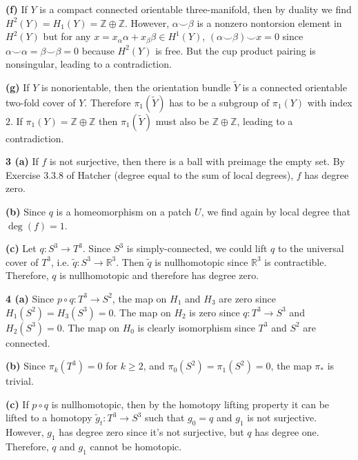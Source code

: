\documentclass{article}
\makeatletter
\newcommand*{\shifttext}[1]{%
  \settowidth{\@tempdima}{#1}%
  \hspace{-\@tempdima}#1%
}
\newcommand{\plabel}[1]{%
\shifttext{\textbf{#1}\quad}%
}
\newcommand{\prule}{%
\begin{center}%
\hdashrule[0.5ex]{.99\linewidth}{1pt}{1pt 2.5pt}%
\end{center}%
}
\makeatother
\begin{document}
\plabel{(f)}%
If $Y$ is a compact connected orientable three-manifold, then by duality we find $H^2(Y) = H_1(Y) = \mathbb{Z}\oplus \mathbb{Z}$.
However, $\alpha \smile \beta$ is a nonzero nontorsion element in $H^2(Y)$ but for any $x = x_\alpha \alpha + x_\beta \beta\in H^1(Y)$, $(\alpha\smile \beta)\smile x = 0$ since $\alpha\smile \alpha = \beta\smile\beta = 0$ because $H^2(Y)$ is free.
But the cup product pairing is nonsingular, leading to a contradiction.

\plabel{(g)}%
If $Y$ is nonorientable, then the orientation bundle $\tilde{Y}$ is a connected orientable two-fold cover of $Y$.
Therefore $\pi_1(\tilde{Y})$ has to be a subgroup of $\pi_1(Y)$ with index $2$.
If $\pi_1(Y) = \mathbb{Z}\oplus \mathbb{Z}$ then $\pi_1(\tilde{Y})$ must also be $\mathbb{Z}\oplus \mathbb{Z}$, leading to a contradiction.

\prule

\plabel{3 (a)}%
If $f$ is not surjective, then there is a ball with preimage the empty set.
By Exercise 3.3.8 of Hatcher (degree equal to the sum of local degrees), $f$ has degree zero.

\plabel{(b)}%
Since $q$ is a homeomorphism on a patch $U$, we find again by local degree that $\operatorname{deg}(f) = 1$.

\plabel{(c)}%
Let $q:S^3\rightarrow T^3$.
Since $S^3$ is simply-connected, we could lift $q$ to the universal cover of $T^3$, i.e. $\tilde{q}:S^3 \rightarrow \mathbb{R}^3$.
Then $\tilde{q}$ is nullhomotopic since $\mathbb{R}^3$ is contractible.
Therefore, $q$ is nullhomotopic and therefore has degree zero.

\prule

\plabel{4 (a)}%
Since $p\circ q: T^3 \rightarrow S^2$, the map on $H_1$ and $H_3$ are zero since $H_1(S^2) = H_3(S^3) = 0.$
The map on $H_2$ is zero since $q:T^3\rightarrow S^3$ and $H_2(S^3)=0$.
The map on $H_0$ is clearly isomorphism since $T^3$ and $S^2$ are connected.

\plabel{(b)}%
Since $\pi_k(T^3)=0$ for $k\ge 2$, and $\pi_0(S^2) = \pi_1(S^2) = 0$, the map $\pi_*$ is trivial.

\plabel{(c)}%
If $p\circ q$ is nullhomotopic, then by the homotopy lifting property it can be lifted to a homotopy $\tilde{g}_t: T^3\rightarrow S^3$ such that $g_0 = q$ and $g_1$ is not surjective.
However, $g_1$ has degree zero since it's not surjective, but $q$ has degree one.
Therefore, $q$ and $g_1$ cannot be homotopic.

\prule
\end{document}
